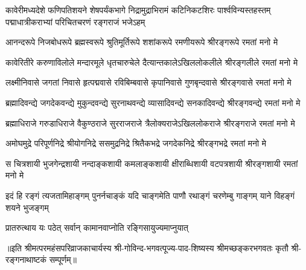 
{कावेरीमध्यदेशे फणिपतिशयने शेषपर्यंकभागे}
{निद्रामुद्राभिरामं कटिनिकटशिरः पार्श्वविन्यस्तहस्तम्}
{पद्माधात्रीकराभ्यां परिचितचरणं रङ्गराजं भजेऽहम्}

\fourlineindentedshloka
{आनन्दरूपे  निजबोधरूपे}
{ब्रह्मस्वरूपे श्रुतिमूर्तिरूपे}
{शशांकरूपे रमणीयरूपे}
{श्रीरङ्गरूपे रमतां मनो मे}

\fourlineindentedshloka
{कावेरितीरे करुणाविलोले}
{मन्दारमूले धृतचारुचेले}
{दैत्यान्तकालेऽखिललोकलीले}
{श्रीरङ्गलीले रमतां मनो मे}

\fourlineindentedshloka
{लक्ष्मीनिवासे जगतां निवासे}
{हृत्पद्मवासे रविबिम्बवासे}
{कृपानिवासे गुणबृन्दवासे}
{श्रीरङ्गवासे रमतां मनो मे}


\fourlineindentedshloka
{ब्रह्मादिवन्द्ये जगदेकवन्द्ये}
{मुकुन्दवन्द्ये सुरनाथवन्द्ये}
{व्यासादिवन्द्ये सनकादिवन्द्ये}
{श्रीरङ्गवन्द्ये रमतां मनो मे}

\fourlineindentedshloka
{ब्रह्माधिराजे गरुडाधिराजे}
{वैकुण्ठराजे सुरराजराजे}
{त्रैलोक्यराजेऽखिललोकराजे}
{श्रीरङ्गराजे रमतां मनो मे}

\fourlineindentedshloka
{अमोघमुद्रे परिपूर्णनिद्रे}
{श्रीयोगनिद्रे ससमुद्रनिद्रे}
{श्रितैकभद्रे जगदेकनिद्रे}
{श्रीरङ्गभद्रे रमतां मनो मे}


\fourlineindentedshloka
{स चित्रशायी भुजगेन्द्रशायी}
{नन्दाङ्कशायी कमलाङ्कशायी}
{क्षीराब्धिशायी वटपत्रशायी}
{श्रीरङ्गशायी रमतां मनो मे}


\fourlineindentedshloka
{इदं हि रङ्गं त्यजतामिहाङ्गम्}
{पुनर्नचाङ्कं यदि चाङ्गमेति}
{पाणौ रथाङ्गं चरणेम्बु गाङ्गम्}
{याने विहङ्गं शयने भुजङ्गम्}


{प्रातरुत्थाय यः पठेत्}
{सर्वान् कामानवाप्नोति}
{रङ्गिसायुज्यमाप्नुयात्}

{॥इति श्रीमत्परमहंसपरिव्राजकाचार्यस्य श्री-गोविन्द-भगवत्पूज्य-पाद-शिष्यस्य 
श्रीमच्छङ्करभगवतः कृतौ श्री-रङ्गनाथाष्टकं सम्पूर्णम्॥}